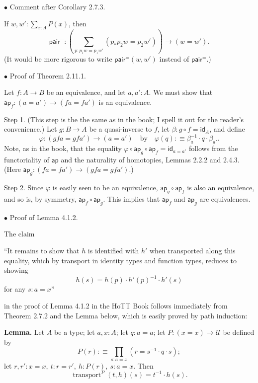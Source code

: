 \documentclass[12pt]{article}
\newcommand{\msf}{\mathsf}
\newcommand{\nn}{\noindent}
\newcommand{\oo}{\operatorname}
\newcommand{\ap}{\mathsf{ap}}
\newcommand{\id}{\mathsf{id}}
\newcommand{\U}{\mathcal U}
\begin{document}

\nn$\bullet$ Comment after Corollary 2.7.3.

If $w,w':\sum_{x:A}P(x)$, then 
$$
\msf{pair}^=:\left(\sum_{p:p_1w=p_1w'}(p_*p_2w=p_2w')\right)\to(w=w').
$$ 
(It would be more rigorous to write $\msf{pair}^=(w,w')$ instead of $\msf{pair}^=$.)


\nn$\bullet$ Proof of Theorem 2.11.1. 

Let $f:A\to B$ be an equivalence, and let $a,a':A$. We must show that $\ap_f:(a=a')\to (fa=fa')$ is an equivalence.

Step 1. (This step is the the same as in the book; I spell it out for the reader's convenience.) Let $g:B\to A$ be a quasi-inverse to $f$, let $\beta:g\circ f=\id_A$, and define 
$$
\varphi:(gfa=gfa')\to(a=a')\quad\text{by}\quad\varphi(q):\equiv\beta_a^{-1}\cdot q\cdot\beta_{a'}.
$$ 
Note, as in the book, that the equality $\varphi\circ\ap_g\circ\ap_f=\id_{a=a'}$ follows from the functoriality of $\ap$ and the naturality of homotopies, Lemmas 2.2.2 and 2.4.3. (Here $\ap_g:(fa=fa')\to (gfa=gfa')$.)

Step 2. Since $\varphi$ is easily seen to be an equivalence, $\ap_g\circ\ap_f$ is also an equivalence, and so is, by symmetry, $\ap_f\circ\ap_g$. This implies that $\ap_f$ and $\ap_g$ are equivalences.



\nn$\bullet$ Proof of Lemma 4.1.2.

The claim

\nn ``It remains to show that $h$ is identified with $h'$ when transported along this equality, which by transport in identity types and function types, reduces to showing 
$$
h(s)=h(p)\cdot h'(p)^{-1}\cdot h'(s)
$$ 
for any $s:a=x$''

\nn in the proof of Lemma 4.1.2 in the HoTT Book follows immediately from Theorem 2.7.2 and the Lemma below, which is easily proved by path induction:

\nn \textbf{Lemma.} Let $A$ be a type; let $a,x:A$; let $q:a=a$; let $P:(x=x)\to\U$ be defined by 
$$
P(r):\equiv\prod_{s:a=x}(r=s^{-1}\cdot q\cdot s);
$$ 
let $r,r':x=x,\ t:r=r',\ h:P(r),\ s:a=x$. Then 
$$
\oo{transport}^P(t,h)(s)=t^{-1}\cdot h(s).
$$ 
\end{document}
